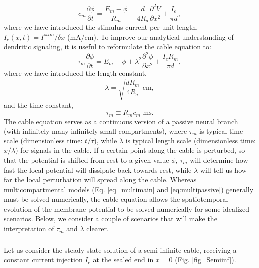 \begin{equation}
c_m \frac{\partial \phi}{\partial t} = \frac{E_m-\phi}{R_m} +  \frac{d}{4 R_a}  \frac{\partial^2 V}{\partial x^2}  + \frac{I_e}{\pi d},
\label{eq:cable}
\end{equation}
where we have introduced the stimulus current per unit length, $I_e(x,t) = I^{stim}/\delta x$ (mA/cm). To improve our analytical understanding of dendritic signaling, it is useful to reformulate the cable equation to:
\begin{equation}
\tau_m \frac{\partial \phi}{\partial t} = E_m-\phi +   \lambda^2  \frac{\partial^2 \phi}{\partial x^2}  + \frac{I_e R_m}{\pi d},
\label{eq:cable2}
\end{equation}
where we have introduced the length constant,
\begin{equation}
\lambda = \sqrt{\frac{d R_m}{4 R_a}} \,\, \text{cm}, 
\label{eq:lengthconst}
\end{equation}
and the time constant, 
\begin{equation}
\tau_m \equiv R_m c_m  \,\, \text{ms}.
\label{eq:timeconst}
\end{equation}
The cable equation serves as a continuous version of a passive neural branch (with infinitely many infinitely small compartments), 
where $\tau_m$ is typical time scale (dimensionless time: $t/\tau$), while $\lambda$  is typical length scale  (dimensionless time: $x/\lambda$) for signals in the cable. If a certain point along the cable is perturbed, so that the potential is shifted from rest to a given value $\phi$, $\tau_m$ will determine how fast the local potential will dissipate back towards rest, while $\lambda$ will tell us how far the local perturbation will spread along the cable. Whereas multicompartmental models (Eq. \ref{eq_multimain} and \ref{eq:multipassive}) generally must be solved numerically, the cable equation allows the spatiotemporal evolution of the membrane potential to be solved numerically for some idealized scenarios. Below, we consider a couple of scenarios that will  make the interpretation of $\tau_m$ and $\lambda$ clearer. 


\subsubsection{}
Let us consider the steady state solution of a semi-infinite cable, receiving a constant current injection $I_e$ at the sealed end in $x=0$ (Fig. \ref{fig_Semiinf}).

